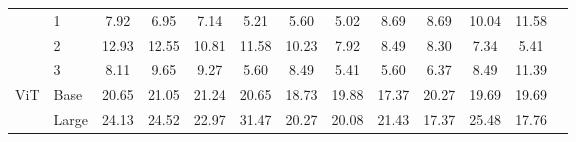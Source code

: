 \begin{table}[ht]
\begin{tabular}{llccccc|cccccc}
                              & 1  & 7.92 & 6.95 & 7.14 & 5.21 & 5.60 & 5.02 & 8.69 & 8.69 & 10.04 & 11.58 \\
                              & 2  & 12.93 & 12.55 & 10.81 & 11.58 & 10.23 & 7.92 & 8.49 & 8.30 & 7.34 & 5.41 \\
                              & 3  & 8.11 & 9.65 & 9.27 & 5.60 & 8.49 & 5.41 & 5.60 & 6.37 & 8.49 & 11.39 \\
\midrule
\multirow{2}{*}{ViT}    & Base  & 20.65 & 21.05 & 21.24 & 20.65 & 18.73 & 19.88 & 17.37 & 20.27 & 19.69 & 19.69 \\
                        & Large & 24.13 & 24.52 & 22.97 & 31.47 & 20.27 & 20.08 & 21.43 & 17.37 & 25.48 & 17.76 \\
\bottomrule
\end{tabular}
\end{table}

